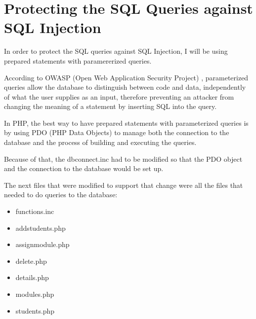 \chapter{Protecting the SQL Queries against SQL Injection}

In order to protect the SQL queries against SQL Injection, I will be using prepared statements with paramererized queries.

According to OWASP (Open Web Application Security Project) \cite{sqlinjection}, parameterized queries allow the database to distinguish between code and data, independently of what the user supplies as an input, therefore preventing an attacker from changing the meaning of a statement by inserting SQL into the query.

In PHP, the best way to have prepared statements with parameterized queries is by using PDO (PHP Data Objects) to manage both the connection to the database and the process of building and executing the queries.

Because of that, the dbconnect.inc had to be modified so that the PDO object and the connection to the database would be set up.

\captionsetup{type=figure}


The next files that were modified to support that change were all the files that needed to do queries to the database:

\begin{itemize}
  \item functions.inc
  \item addstudents.php
  \item assignmodule.php
  \item delete.php
  \item details.php
  \item modules.php
  \item students.php
\end{itemize}

\captionsetup{type=figure}


\captionsetup{type=figure}


\captionsetup{type=figure}


\captionsetup{type=figure}


\captionsetup{type=figure}


\captionsetup{type=figure}


\captionsetup{type=figure}

